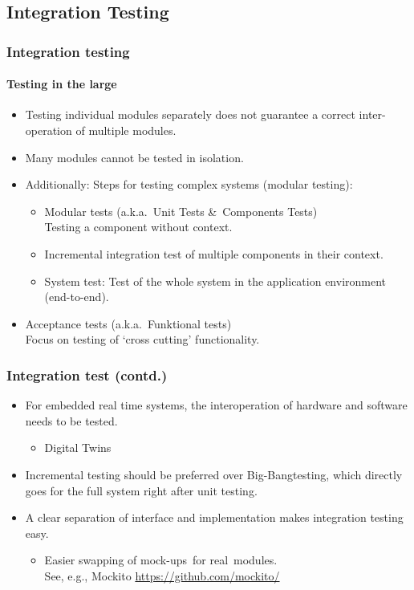 \subsection{Integration Testing}


\begin{frame}
\frametitle{Integration testing}
\framesubtitle{Testing in the large}
\begin{itemize}
  \item Testing individual modules separately does not guarantee a correct inter-operation of multiple modules.
  \item Many modules cannot be tested in isolation.
  \item Additionally: Steps for testing complex systems (modular testing):
    \begin{itemize}
      \item Modular tests (a.k.a.\ Unit Tests \&\ Components Tests)\\
			Testing a component without context.
      \item Incremental integration test of multiple components in their context.
      \item System test: Test of the whole system in the application environment (end-to-end).
    \end{itemize}
	\item Acceptance tests (a.k.a.\ Funktional tests)\\
Focus on testing of `cross cutting' functionality.
\end{itemize}
\end{frame}


\begin{frame}
\frametitle{Integration test (contd.)}
\begin{itemize}
  \item For embedded real time systems, the interoperation of hardware and software needs to be tested.
	\begin{itemize}
		\item Digital Twins
	\end{itemize}
  \item Incremental testing should be preferred over \glq Big-Bang\grq testing, which directly goes for the full system right after unit testing.
  \item A clear separation of interface and implementation makes integration testing easy.
    \begin{itemize}
      \item Easier swapping of \glq mock-ups\grq\ for \glq real\grq\ modules.\\
			See, e.g., Mockito \url{https://github.com/mockito/}
    \end{itemize}
\end{itemize}
\end{frame}


